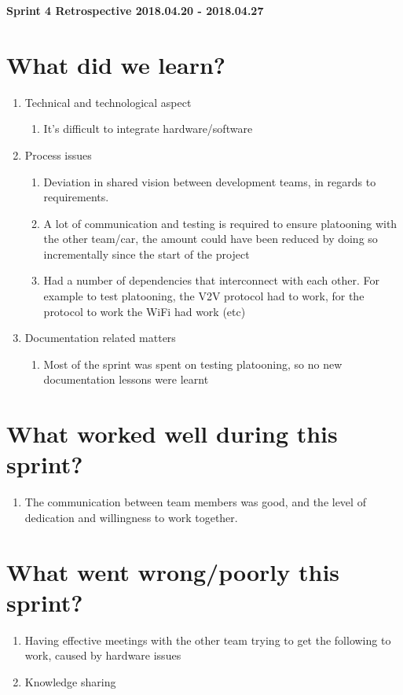 \documentclass[11pt]{article}
\begin{document}
\textbf{\LARGE Sprint 4 Retrospective 2018.04.20 - 2018.04.27}

\section*{What did we learn?}
\begin{enumerate}
	\item Technical and technological aspect
		\begin{enumerate} 
			\item It’s difficult to integrate hardware/software
		\end{enumerate} 
	\item Process issues
		\begin{enumerate} 
			\item Deviation in shared vision between development teams, in regards to requirements. 
			\item A lot of communication and testing is required to ensure platooning with the other team/car, the amount could have been reduced by doing so incrementally since the start of the project
			\item Had a number of dependencies that interconnect with each other. For example to test platooning, the V2V protocol had to work, for the protocol to work the WiFi had work (etc)
		\end{enumerate}		
	\item Documentation related matters
		\begin{enumerate} 
			\item Most of the sprint was spent on testing platooning, so no new documentation lessons were learnt 
		\end{enumerate}	
\end{enumerate} 

\section*{What worked well during this sprint?}
\begin{enumerate}
	\item The communication between team members was good, and the level of dedication and willingness to work together.
\end{enumerate} 

\section*{What went wrong/poorly this sprint?}
\begin{enumerate}
	\item Having effective meetings with the other team trying to get the following to work, caused by hardware issues
	\item Knowledge sharing
\end{enumerate} 
\end{document}
